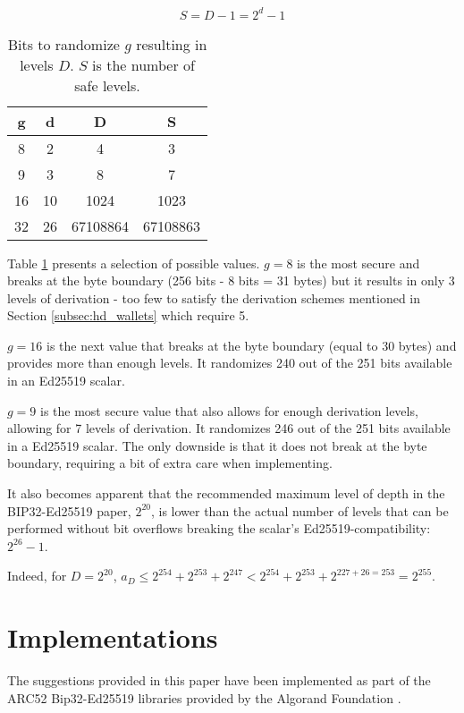 \documentclass[12pt, a4paper, twocolumn]{article}
\begin{document}
 \begin{equation*}
  S = D - 1 = 2^{d} - 1
  \end{equation*}

\begin{table}[h]
  \centering
  \begin{tabular}{|c|c|c|c|}
  \hline
  g & d  & D & S  \\
  \hline
  8 & 2 & 4 & 3 \\
  9 & 3 & 8 & 7 \\
  16 & 10 & 1024 & 1023 \\
  32 & 26 & 67108864 & 67108863  \\
  \hline
  \end{tabular}
  \caption{Bits to randomize $g$ resulting in levels $D$. $S$ is the number of safe levels.}
  \label{tab:g_and_d}
  \end{table}


Table \ref{tab:g_and_d} presents a selection of possible values. $g=8$ is the most secure and breaks at the byte boundary (256 bits - 8 bits = 31 bytes) but it results in only 3 levels of derivation - too few to satisfy the derivation schemes mentioned in Section \ref{subsec:hd_wallets} which require 5.

$g=16$ is the next value that breaks at the byte boundary (equal to 30 bytes) and provides more than enough levels. It randomizes 240 out of the 251 bits available in an Ed25519 scalar.

$g=9$ is the most secure value that also allows for enough derivation levels, allowing for 7 levels of derivation. It randomizes 246 out of the 251 bits available in a Ed25519 scalar. The only downside is that it does not break at the byte boundary, requiring a bit of extra care when implementing.

It also becomes apparent that the recommended maximum level of depth in the BIP32-Ed25519 paper, $2^{20}$, is lower than the actual number of levels that can be performed without bit overflows breaking the scalar's Ed25519-compatibility: $2^{26} - 1$.

Indeed, for $D=2^{20}$, $a_{D} \leq 2^{254} + 2^{253} + 2^{247} < 2^{254} + 2^{253} + 2^{227+26=253} = 2^{255}$.


\section{Implementations}


The suggestions provided in this paper have been implemented as part of the ARC52 Bip32-Ed25519 libraries provided by the Algorand Foundation \cite{AF}.
\end{document}
